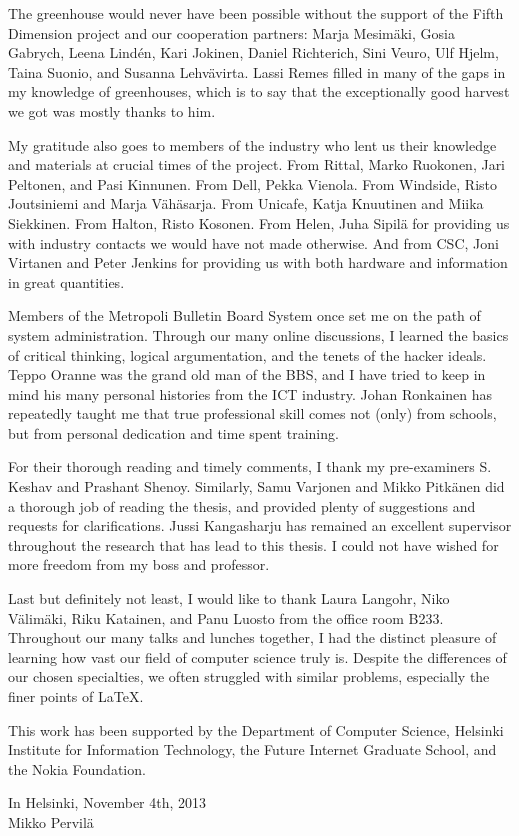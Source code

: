 The greenhouse would never have been possible without the support of the Fifth
Dimension project and our cooperation partners: Marja Mesimäki, Gosia Gabrych,
Leena Lindén, Kari Jokinen, Daniel Richterich, Sini Veuro, Ulf Hjelm, Taina
Suonio, and Susanna Lehvävirta. Lassi Remes filled in many of the gaps in my
knowledge of greenhouses, which is to say that the exceptionally good harvest
we got was mostly thanks to him.

My gratitude also goes to members of the industry who lent us their knowledge
and materials at crucial times of the project. From Rittal, Marko Ruokonen,
Jari Peltonen, and Pasi Kinnunen. From Dell, Pekka Vienola. From Windside,
Risto Joutsiniemi and Marja Vähäsarja. From Unicafe, Katja Knuutinen and Miika
Siekkinen. From Halton, Risto Kosonen. From Helen, Juha Sipilä for providing
us with industry contacts we would have not made otherwise. And from CSC, Joni
Virtanen and Peter Jenkins for providing us with both hardware and information
in great quantities.

Members of the Metropoli Bulletin Board System once set me on the path of
system administration. Through our many online discussions, I learned the
basics of critical thinking, logical argumentation, and the tenets of the
hacker ideals. Teppo Oranne was the grand old man of the BBS, and I have tried
to keep in mind his many personal histories from the ICT industry. Johan
Ronkainen has repeatedly taught me that true professional skill comes not
(only) from schools, but from personal dedication and time spent training. 

For their thorough reading and timely comments, I thank my pre-examiners S.
Keshav and Prashant Shenoy. Similarly, Samu Varjonen and Mikko Pitkänen did a
thorough job of reading the thesis, and provided plenty of suggestions and
requests for clarifications. Jussi Kangasharju has remained an excellent
supervisor throughout the research that has lead to this thesis. I could not
have wished for more freedom from my boss and professor.

Last but definitely not least, I would like to thank Laura Langohr, Niko
Välimäki, Riku Katainen, and Panu Luosto from the office room B233. Throughout
our many talks and lunches together, I had the distinct pleasure of learning
how vast our field of computer science truly is. Despite the differences of
our chosen specialties, we often struggled with similar problems, especially
the finer points of \LaTeX.

This work has been supported by the Department of Computer Science, Helsinki
Institute for Information Technology, the Future Internet Graduate School, and
the Nokia Foundation.

\begin{flushright}
In Helsinki, November 4th, 2013\\
\vspace{3em}
Mikko Pervilä\\
\end{flushright}
